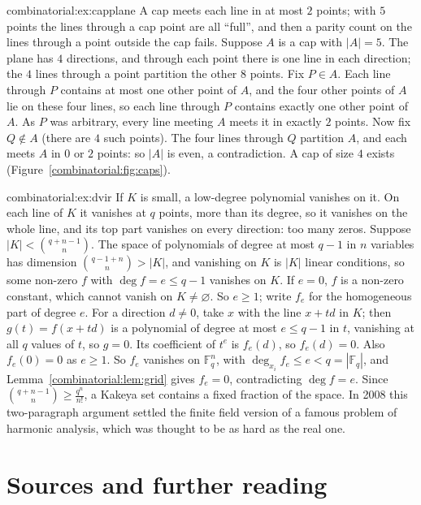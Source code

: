 \begin{solution}{combinatorial:ex:capplane}
\idea A cap meets each line in at most $2$ points; with $5$ points the lines through a cap point are all ``full'', and then a parity count on the lines through a point outside the cap fails.
\writeup Suppose $A$ is a cap with $|A|=5$. The plane has $4$ directions, and through each point there is one line in each direction; the $4$ lines through a point partition the other $8$ points. Fix $P\in A$. Each line
through $P$ contains at most one other point of $A$, and the four other points of $A$ lie on these four lines, so each line through $P$ contains exactly one other point of $A$. As $P$ was arbitrary, every line
meeting $A$ meets it in exactly $2$ points. Now fix $Q\notin A$ (there are $4$ such points). The four lines through $Q$ partition $A$, and each meets $A$ in $0$ or $2$ points: so $|A|$ is even, a contradiction.
A cap of size $4$ exists (Figure~\ref{combinatorial:fig:caps}).
\end{solution}

\begin{solution}{combinatorial:ex:dvir}
\idea If $K$ is small, a low-degree polynomial vanishes on it. On each line of $K$ it vanishes at $q$ points, more than its degree, so it vanishes on the whole line, and its top part vanishes on every direction: too many zeros.
\writeup Suppose $|K|<\binom{q+n-1}n$. The space of polynomials of degree at most $q-1$ in $n$ variables has dimension $\binom{q-1+n}n>|K|$, and vanishing on $K$ is $|K|$ linear conditions, so some non-zero $f$ with
$\deg f=e\le q-1$ vanishes on $K$. If $e=0$, $f$ is a non-zero constant, which cannot vanish on $K\ne\varnothing$. So $e\ge1$; write $f_e$ for the homogeneous part of degree $e$. For a direction $d\ne0$, take $x$ with
the line $x+td$ in $K$; then $g(t)=f(x+td)$ is a polynomial of degree at most $e\le q-1$ in $t$, vanishing at all $q$ values of $t$, so $g=0$. Its coefficient of $t^e$ is $f_e(d)$, so $f_e(d)=0$. Also $f_e(0)=0$ as
$e\ge1$. So $f_e$ vanishes on $\mathbb F_q^n$, with $\deg_{x_i}f_e\le e<q=|\mathbb F_q|$, and Lemma~\ref{combinatorial:lem:grid} gives $f_e=0$, contradicting $\deg f=e$. Since $\binom{q+n-1}n\ge\frac{q^n}{n!}$, a Kakeya set contains a
fixed fraction of the space. In 2008 this two-paragraph argument settled the finite field version of a famous problem of harmonic analysis, which was thought to be as hard as the real one.
\end{solution}

\section*{Sources and further reading}

